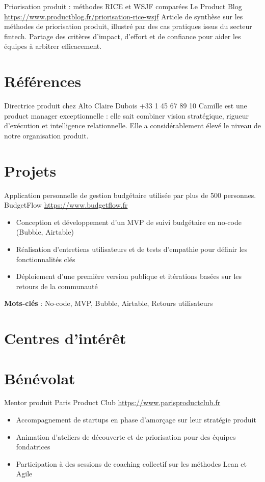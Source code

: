 \documentclass[a4paper, serif, 10pt]{moderncv}
\begin{document}
        {Priorisation produit : méthodes RICE et WSJF comparées}
        {Le Product Blog}
        {\url{https://www.productblog.fr/priorisation-rice-wsjf}}
        {}
        {Article de synthèse sur les méthodes de priorisation produit, illustré par des cas pratiques issus du secteur fintech. Partage des critères d'impact, d'effort et de confiance pour aider les équipes à arbitrer efficacement.}
\section{Références}

        {Directrice produit chez Alto}
        {Claire Dubois}
        {+33 1 45 67 89 10}
        {}
        {Camille est une product manager exceptionnelle : elle sait combiner vision stratégique, rigueur d'exécution et intelligence relationnelle. Elle a considérablement élevé le niveau de notre organisation produit.}
\section{Projets}

        {Application personnelle de gestion budgétaire utilisée par plus de 500 personnes.}
        {BudgetFlow}
        {\url{https://www.budgetflow.fr}}
        {}
        {\begin{itemize}
\item Conception et développement d'un MVP de suivi budgétaire en no-code (Bubble, Airtable)
\item Réalisation d'entretiens utilisateurs et de tests d'empathie pour définir les fonctionnalités clés
\item Déploiement d'une première version publique et itérations basées sur les retours de la communauté
\end{itemize}
\textbf{Mots-clés} : No-code, MVP, Bubble, Airtable, Retours utilisateurs}
\section{Centres d'intérêt}

\section{Bénévolat}

        {Mentor produit}
        {Paris Product Club}
        {\url{https://www.parisproductclub.fr}}
        {}
        {\begin{itemize}
\item Accompagnement de startups en phase d'amorçage sur leur stratégie produit
\item Animation d'ateliers de découverte et de priorisation pour des équipes fondatrices
\item Participation à des sessions de coaching collectif sur les méthodes Lean et Agile
\end{itemize}}
\end{document}
